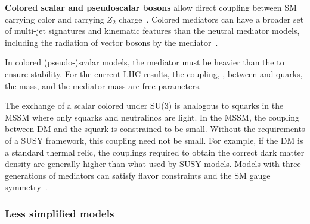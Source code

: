 \textbf{Colored scalar and pseudoscalar bosons} allow direct coupling between SM carrying color and \IP carrying $Z_2$ charge~\cite{Bai:2013iqa, Papucci:2014iwa, An:2013xka, Bell:2012rg}. Colored mediators can have a broader set of multi-jet signatures and kinematic features than the neutral mediator models, including the radiation of vector bosons by the mediator~\cite{Bell:2012rg}. 

In colored (pseudo-)scalar models, the mediator must be heavier than the \IP to ensure \IP stability. 
For the current LHC results, the coupling, \gdmq, between \IP and quarks, the \IP mass, and the mediator mass are free parameters. 

The exchange of a scalar colored under SU(3) is analogous to squarks in the MSSM where only squarks and neutralinos are light.
In the MSSM, the coupling between DM and the squark is constrained to be small\cite{Abercrombie:2015wmb}.
Without the requirements of a SUSY framework, this coupling need not be small. 
For example, if the DM is a standard thermal relic, the couplings required to obtain the correct dark matter density are generally higher than what used by SUSY models.
Models with three generations of mediators can satisfy flavor constraints and the SM gauge symmetry~\cite{Ko:2016zxg}. 


\subsubsection{Less simplified models}
\label{sec:LessSimplifiedModels}

